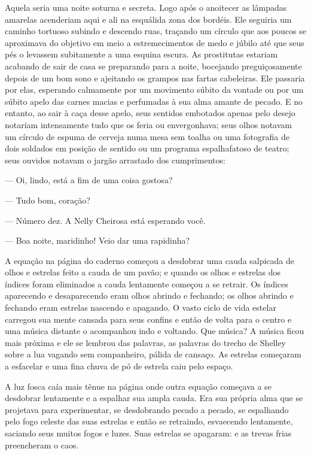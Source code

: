 Aquela seria uma noite soturna e secreta. Logo após o anoitecer as
lâmpadas amarelas acenderiam aqui e ali na esquálida zona dos bordéis.
Ele seguiria um caminho tortuoso subindo e descendo ruas, traçando um
círculo que aos poucos se aproximava do objetivo em meio a
estremecimentos de medo e júbilo até que seus pés o levassem
subitamente a uma esquina escura. As prostitutas estariam acabando de
sair de casa se preparando para a noite, bocejando preguiçosamente
depois de um bom sono e ajeitando os grampos nas fartas cabeleiras. Ele
passaria por elas, esperando calmamente por um movimento súbito da 
vontade ou por um súbito apelo das carnes macias e perfumadas à sua
alma amante de pecado. E no entanto, ao sair à caça desse apelo, seus
sentidos embotados apenas pelo desejo notariam intensamente tudo que
os feria ou envergonhava; seus olhos notavam um círculo de espuma de
cerveja numa mesa sem toalha ou uma fotografia de dois soldados em
posição de sentido ou um programa espalhafatoso de teatro; seus ouvidos
notavam o jargão arrastado dos cumprimentos:

 --- Oi, lindo, está a fim de uma coisa gostosa?

 --- Tudo bom, coração?

 --- Número dez. A Nelly Cheirosa está esperando você.

 --- Boa noite, maridinho! Veio dar uma rapidinha?

A equação na página do caderno começou a desdobrar uma cauda salpicada
de olhos e estrelas feito a cauda de um pavão; e quando os olhos e
estrelas dos índices foram eliminados a cauda lentamente começou a se
retrair. Os índices aparecendo e desaparecendo eram olhos abrindo e
fechando; os olhos abrindo e fechando eram estrelas nascendo e
apagando. O vasto ciclo de vida estelar carregou sua mente cansada para
seus confins e então de volta para o centro e uma música distante o
acompanhou indo e voltando. Que música? A música ficou mais próxima e
ele se lembrou das palavras, as palavras do trecho de Shelley sobre a
lua vagando sem companheiro, pálida de cansaço. As estrelas começaram a
esfacelar e uma fina chuva de pó de estrela caiu pelo espaço.

A luz fosca caía mais tênue na página onde outra equação começava a se
desdobrar lentamente e a espalhar sua ampla cauda. Era sua própria alma
que se projetava para experimentar, se desdobrando pecado a pecado, se
espalhando pelo fogo celeste das suas estrelas e então se retraindo,
esvaecendo lentamente, saciando seus muitos fogos e luzes. Suas
estrelas se apagaram: e as trevas frias preencheram o caos.

